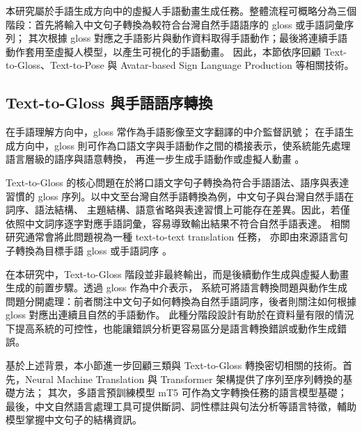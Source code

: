 \documentclass[class=NCU_thesis, crop=false]{standalone}
\begin{document}
本研究屬於手語生成方向中的虛擬人手語動畫生成任務。整體流程可概略分為三個階段：首先將輸入中文句子轉換為較符合台灣自然手語語序的 gloss 或手語詞彙序列；
其次根據 gloss 對應之手語影片與動作資料取得手語動作；最後將連續手語動作套用至虛擬人模型，以產生可視化的手語動畫。
因此，本節依序回顧 Text-to-Gloss、Text-to-Pose 與 Avatar-based Sign Language Production 等相關技術。

\subsection{Text-to-Gloss 與手語語序轉換}
\label{subsec:text_to_gloss}

在手語理解方向中，gloss 常作為手語影像至文字翻譯的中介監督訊號；
在手語生成方向中，gloss 則可作為口語文字與手語動作之間的橋接表示，使系統能先處理語言層級的語序與語意轉換，
再進一步生成手語動作或虛擬人動畫 \cite{koller2020quantitative,Camgoz_2020_CVPR}。

Text-to-Gloss 的核心問題在於將口語文字句子轉換為符合手語語法、語序與表達習慣的 gloss 序列。以中文至台灣自然手語轉換為例，中文句子與台灣自然手語在詞序、語法結構、
主題結構、語意省略與表達習慣上可能存在差異。因此，若僅依照中文詞序逐字對應手語詞彙，容易導致輸出結果不符合自然手語表達。
相關研究通常會將此問題視為一種 text-to-text translation 任務，
亦即由來源語言句子轉換為目標手語 gloss 或手語詞序 \cite{abdullah2025stateofthearttranslationtexttoglossusing,Chu2025SLT}。

在本研究中，Text-to-Gloss 階段並非最終輸出，而是後續動作生成與虛擬人動畫生成的前置步驟。透過 gloss 作為中介表示，
系統可將語言轉換問題與動作生成問題分開處理：前者關注中文句子如何轉換為自然手語詞序，後者則關注如何根據 gloss 對應出連續且自然的手語動作。
此種分階段設計有助於在資料量有限的情況下提高系統的可控性，也能讓錯誤分析更容易區分是語言轉換錯誤或動作生成錯誤。

基於上述背景，本小節進一步回顧三類與 Text-to-Gloss 轉換密切相關的技術。首先，Neural Machine Translation 與 Transformer 架構提供了序列至序列轉換的基礎方法；
其次，多語言預訓練模型 mT5 可作為文字轉換任務的語言模型基礎；最後，中文自然語言處理工具可提供斷詞、詞性標註與句法分析等語言特徵，輔助模型掌握中文句子的結構資訊。

\end{document}
